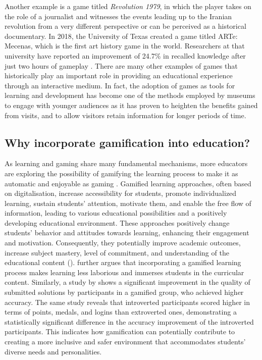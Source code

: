 \documentclass[output=paper]{langscibook}
\begin{document}
Another example is a game titled \textit{Revolution 1979}, in which the player takes on the role of a journalist and witnesses the events leading up to the Iranian revolution from a very different perspective or can be perceived as a historical documentary. In 2018, the University of Texas created a game titled ARTe: Mecenas, which is the first art history game in the world. Researchers at that university have reported an improvement of 24.7\% in recalled knowledge after just two hours of gameplay \citep{thomas2018effective}. There are many other examples of games that historically play an important role in providing an educational experience through an interactive medium. In fact, the adoption of games as tools for learning and development has become one of the methods employed by museums to engage with younger audiences \citep{styx2022museums} as it has proven to heighten the benefits gained from visits, and to allow visitors retain information for longer periods of time.

\subsection{Why incorporate gamification into education?}

As learning and gaming share many fundamental mechanisms, more educators are exploring the possibility of gamifying the learning process to make it as automatic and enjoyable as gaming \citep{wang2021gamification}. Gamified learning approaches, often based on digitalisation, increase accessibility for students, promote individualized learning, sustain students’ attention, motivate them, and enable the free flow of information, leading to various educational possibilities and a positively developing educational environment. These approaches positively change students' behavior and attitudes towards learning, enhancing their engagement and motivation. Consequently, they potentially improve academic outcomes, increase subject mastery, level of commitment, and understanding of the educational content (\cites[4]{balalle2024student}[679]{kiryakova2014gamification}). \citet{wang2021gamification} further argues that incorporating a gamified learning process makes learning less laborious and immerses students in the curricular content. Similarly, a study by \citet[7]{smiderle2020gamification} shows a significant improvement in the quality of submitted solutions by participants in a gamified group, who achieved higher accuracy. The same study reveals that introverted participants scored higher in terms of points, medals, and logins than extroverted ones, demonstrating a statistically significant difference in the accuracy improvement of the introverted participants. This indicates how gamification can potentially contribute to creating a more inclusive and safer environment that accommodates students' diverse needs and personalities.
\end{document}

